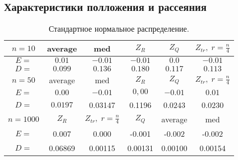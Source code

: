 \documentclass[a4]{article}
\begin{document}
		\subsection{Характеристики полложения и рассеяния}
			\begin{table}[h]
				\caption{ Стандартное нормальное распределение.}
				\begin{center}
					\begin{tabular}{|c|c|c|c|c|c|}
						\hline
						$n = 10$ & average & med & $Z_R$ & $Z_Q$ & $Z_{tr},\;r=\frac{n}{4}$\\
						\hline
						$E =$ & $0.01$ & $-0.01$ &        $-0.01$ &       $0.0$ &         $-0.01$\\
						\hline
						$D =$ & $0.099$&         $0.136$        & $0.180$     &    $0.117$      &   $0.113$\\
						\hline
						$n = 50$ & average & med & $Z_R$ & $Z_Q$ & $Z_{tr},\;r=\frac{n}{4}$\\
						\hline
						$E =$ & $0.00$ & $-0.01$ & $0,00$ & $-0.01$ & $0.01$\\
						\hline
						$D =$ & $0.0197$&         0.03147        & 0.1196      &   0.0243       &  0.0230\\
						\hline
						$n = 1000$ & $Z_R$  & $Z_{tr},\;r=\frac{n}{4}$  &  $Z_Q$ & average & med\\
						\hline
						$E =$ & 0.007&        0.000&                 -0.001 & -0.002       & -0.002\\
						\hline
						$D =$ & 0.06869  &  0.00115    &    0.00131  &0.00100        & 0.00154      \\
						\hline
					\end{tabular}
				\end{center}
			\end{table}
			\newpage
\end{document}
